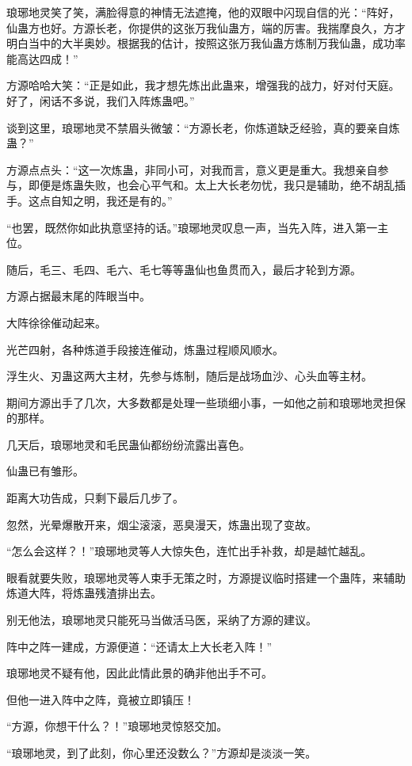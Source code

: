 \begin{this_body}
琅琊地灵笑了笑，满脸得意的神情无法遮掩，他的双眼中闪现自信的光：“阵好，仙蛊方也好。方源长老，你提供的这张万我仙蛊方，端的厉害。我揣摩良久，方才明白当中的大半奥妙。根据我的估计，按照这张万我仙蛊方炼制万我仙蛊，成功率能高达四成！”

方源哈哈大笑：“正是如此，我才想先炼出此蛊来，增强我的战力，好对付天庭。好了，闲话不多说，我们入阵炼蛊吧。”

谈到这里，琅琊地灵不禁眉头微皱：“方源长老，你炼道缺乏经验，真的要亲自炼蛊？”

方源点点头：“这一次炼蛊，非同小可，对我而言，意义更是重大。我想亲自参与，即便是炼蛊失败，也会心平气和。太上大长老勿忧，我只是辅助，绝不胡乱插手。这点自知之明，我还是有的。”

“也罢，既然你如此执意坚持的话。”琅琊地灵叹息一声，当先入阵，进入第一主位。

随后，毛三、毛四、毛六、毛七等等蛊仙也鱼贯而入，最后才轮到方源。

方源占据最末尾的阵眼当中。

大阵徐徐催动起来。

光芒四射，各种炼道手段接连催动，炼蛊过程顺风顺水。

浮生火、刃蛊这两大主材，先参与炼制，随后是战场血沙、心头血等主材。

期间方源出手了几次，大多数都是处理一些琐细小事，一如他之前和琅琊地灵担保的那样。

几天后，琅琊地灵和毛民蛊仙都纷纷流露出喜色。

仙蛊已有雏形。

距离大功告成，只剩下最后几步了。

忽然，光晕爆散开来，烟尘滚滚，恶臭漫天，炼蛊出现了变故。

“怎么会这样？！”琅琊地灵等人大惊失色，连忙出手补救，却是越忙越乱。

眼看就要失败，琅琊地灵等人束手无策之时，方源提议临时搭建一个蛊阵，来辅助炼道大阵，将炼蛊残渣排出去。

别无他法，琅琊地灵只能死马当做活马医，采纳了方源的建议。

阵中之阵一建成，方源便道：“还请太上大长老入阵！”

琅琊地灵不疑有他，因此此情此景的确非他出手不可。

但他一进入阵中之阵，竟被立即镇压！

“方源，你想干什么？！”琅琊地灵惊怒交加。

“琅琊地灵，到了此刻，你心里还没数么？”方源却是淡淡一笑。

\end{this_body}

